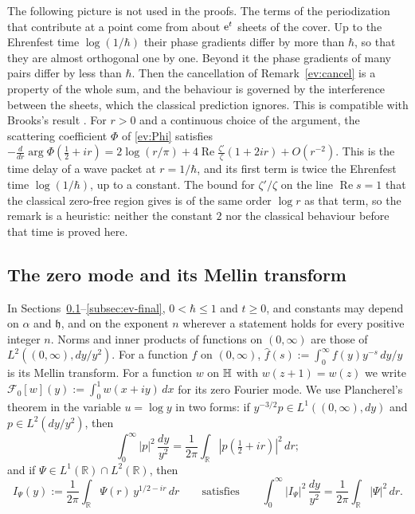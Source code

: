 \begin{remark}[heuristics]\label{ev:time}
The following picture is not used in the proofs. The terms of the periodization that contribute at a point come from
about $\mathrm{e}^{t}$ sheets of the cover. Up to the Ehrenfest time $\log(1/\hbar)$ their phase gradients differ by more than $\hbar$,
so that they are almost orthogonal one by one. Beyond it the phase gradients of many pairs differ by less than $\hbar$. Then the
cancellation of Remark~\ref{ev:cancel} is a property of the whole sum, and the behaviour is governed by the interference between
the sheets, which the classical prediction ignores. This is compatible with Brooks's result \cite{Bro22}. For $r>0$ and a
continuous choice of the argument, the scattering coefficient $\Phi$ of
\eqref{ev:Phi} satisfies $-\tfrac{d}{dr}\arg\Phi(\tfrac12+ir)=2\log(r/\pi)+4\operatorname{Re}\tfrac{\zeta'}{\zeta}(1+2ir)+O(r^{-2})$. This is the
time delay of a wave packet at $r=1/\hbar$, and its first term is twice the Ehrenfest time $\log(1/\hbar)$, up to a constant. The
bound for $\zeta'/\zeta$ on the line $\operatorname{Re}s=1$ that the classical zero-free region gives \cite[Theorem~6.7]{MV07} is of the same order $\log r$
as that term, so the remark is a heuristic: neither the constant $2$ nor the classical behaviour before that time is proved here.
\end{remark}

\subsection{The zero mode and its Mellin transform}\label{subsec:ev-mellin}
In Sections~\ref{subsec:ev-mellin}--\ref{subsec:ev-final}, $0<\hbar\le1$ and $t\ge0$, and constants may depend on $\alpha$ and $\mathfrak h$, and
on the exponent $n$ wherever a statement holds for every positive integer $n$. Norms and inner products of
functions on $(0,\infty)$ are those of $L^2((0,\infty),dy/y^2)$. For a function $f$ on $(0,\infty)$,
$\hat f(s):=\int_0^\infty f(y)y^{-s}\,dy/y$ is its Mellin transform. For a function $w$ on $\mathbb{H}$ with $w(z+1)=w(z)$ we write
$\mathcal F_0[w](y):=\int_0^1w(x+iy)\,dx$ for its zero Fourier mode. We use Plancherel's theorem in the variable $u=\log y$ in two forms: if
$y^{-3/2}p\in L^1((0,\infty),dy)$ and $p\in L^2(dy/y^2)$, then
\begin{equation}\label{ev:MP}
  \int_0^\infty|p|^2\,\frac{dy}{y^2}=\frac1{2\pi}\int_{\mathbb R}|\hat p(\tfrac12+ir)|^2\,dr ;
\end{equation}
and if $\Psi\in L^1(\mathbb R)\cap L^2(\mathbb R)$, then
\begin{equation}\label{ev:IMP}
  I_\Psi(y):=\frac1{2\pi}\int_{\mathbb R}\Psi(r)\,y^{1/2-ir}\,dr\qquad\text{satisfies}\qquad
  \int_0^\infty|I_\Psi|^2\,\frac{dy}{y^2}=\frac1{2\pi}\int_{\mathbb R}|\Psi|^2\,dr .
\end{equation}

